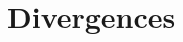 \documentclass[11pt,twoside]{report}
\begin{document}
\setcounter{chapter}{6}

\chapter{Divergences}
\label{chap:lec6}

\end{document}
